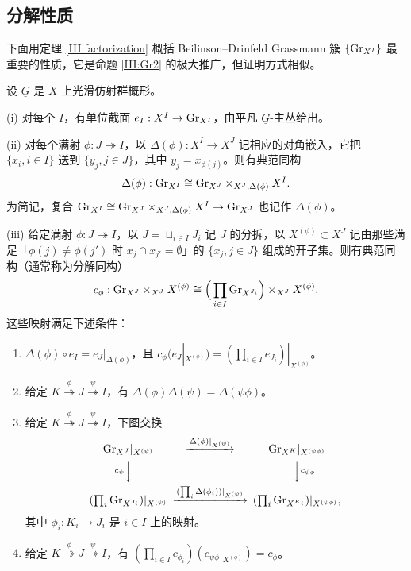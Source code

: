
\subsection{分解性质}

下面用定理 \ref{III:factorization} 概括 Beilinson--Drinfeld Grassmann 簇 $\{{\operatorname{Gr}}_{X^I}\}$ 最重要的性质，它是命题 \ref{III:Gr2} 的极大推广，但证明方式相似。

\begin{thm}\label{III:factorization}
设 $\underline G$ 是 $X$ 上光滑仿射群概形。

(i) 对每个 $I$，有单位截面 $e_I: X^I\to {\operatorname{Gr}}_{X^I}$，由平凡 $\underline G$-主丛给出。

(ii) 对每个满射 $\phi: J\twoheadrightarrow I$，以 $\Delta(\phi):X^I\to X^J$ 记相应的对角嵌入，它把 $\{x_i, i\in I\}$ 送到 $\{y_j, j\in J\}$，其中 $y_j=x_{\phi(j)}$。则有典范同构
\begin{equation}\label{BD restriction}
\Delta(\phi):{\operatorname{Gr}}_{X^I}\cong {\operatorname{Gr}}_{X^J}\times_{X^J,\Delta(\phi)}X^I.
\end{equation}
为简记，复合 ${\operatorname{Gr}}_{X^I}\cong {\operatorname{Gr}}_{X^J}\times_{X^J,\Delta(\phi)}X^I\to {\operatorname{Gr}}_{X^J}$ 也记作 $\Delta(\phi)$。

(iii) 给定满射 $\phi: J\twoheadrightarrow  I$，以 $J=\sqcup_{i\in I}J_i$ 记 $J$ 的分拆，以 $X^{(\phi)}\subset X^J$ 记由那些满足「$\phi(j)\neq \phi(j')$ 时 $x_{j}\cap x_{j'}=\emptyset$」的 $\{x_j, j\in J\}$ 组成的开子集。则有典范同构（通常称为分解同构）
\begin{equation}\label{BD factorization}
c_\phi: {\operatorname{Gr}}_{X^J}\times_{X^J}X^{(\phi)}\cong \Big(\prod_{i\in I}{\operatorname{Gr}}_{X^{J_i}}\Big)\times_{X^J}X^{(\phi)}.
\end{equation}
这些映射满足下述条件：
\begin{enumerate}
\item $\Delta(\phi)\circ e_I=e_J|_{\Delta(\phi)}$，且 $c_\phi (e_J|_{X^{(\phi)}})=(\prod_{i\in I} e_{J_i})|_{X^{(\phi)}}$。
\item 给定 $K\stackrel{\phi}{\twoheadrightarrow}  J\stackrel{\psi}{\twoheadrightarrow}  I$，有 $\Delta(\phi)\Delta(\psi)=\Delta(\psi\phi)$。
\item 给定 $K\stackrel{\phi}{\twoheadrightarrow}  J\stackrel{\psi}{\twoheadrightarrow}  I$，下图交换
\[\begin{CD}
\Gr_{X^J}|_{X^{(\psi)}}@>\Delta(\phi)|_{X^{(\psi)}}>>\Gr_{X^K}|_{X^{(\psi\phi)}}\\
@Vc_{\psi} VV@VV c_{\psi\phi}V\\
(\prod_i\Gr_{X^{J_i}})|_{X^{(\psi)}}@>(\prod_{i}\Delta(\phi_i))|_{X^{(\psi)}}>> (\prod_i \Gr_{X^{K_i}})|_{X^{(\psi\phi)}},
\end{CD}\]
其中 $\phi_i:K_i\to J_i$ 是 $i\in I$ 上的映射。
\item 给定 $K\stackrel{\phi}{\twoheadrightarrow}  J\stackrel{\psi}{\twoheadrightarrow}  I$，有 $(\prod_{i\in I}c_{\phi_i})(c_{\psi\phi}|_{X^{(\phi)}})=c_{\phi}$。
\end{enumerate}
\end{thm}

